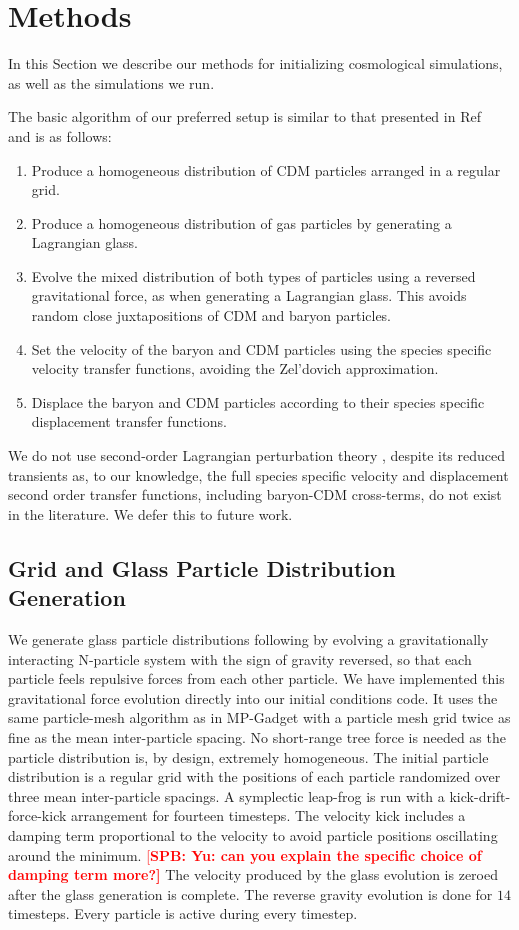 \documentclass[a4paper,11pt]{article}
\newcommand{\spb}[1]{\textcolor{red}{[\bf SPB: #1]} }
\begin{document}
\section{Methods}

In this Section we describe our methods for initializing cosmological simulations, as well as the simulations we run.

The basic algorithm of our preferred setup is similar to that presented in Ref~\cite{Yoshida:2003} and is as follows:
\begin{enumerate}
 \item Produce a homogeneous distribution of CDM particles arranged in a regular grid.
 \item Produce a homogeneous distribution of gas particles by generating a Lagrangian glass.
 \item Evolve the mixed distribution of both types of particles using a reversed gravitational force, as when generating a Lagrangian glass. This avoids random close juxtapositions of CDM and baryon particles.
 \item Set the velocity of the baryon and CDM particles using the species specific velocity transfer functions, avoiding the Zel'dovich approximation.
  \item Displace the baryon and CDM particles according to their species specific displacement transfer functions.
\end{enumerate}

We do not use second-order Lagrangian perturbation theory \cite{Scoccimarro:1998}, despite its reduced transients as, to our knowledge, the full species specific velocity and displacement second order transfer functions, including baryon-CDM cross-terms, do not exist in the literature. We defer this to future work.

\subsection{Grid and Glass Particle Distribution Generation}
\label{sec:glass}

We generate glass particle distributions following \cite{White:1994} by evolving a gravitationally interacting N-particle system with the sign of gravity reversed, so that each particle feels repulsive forces from each other particle. We have implemented this  gravitational force evolution directly into our initial conditions code. It uses the same particle-mesh algorithm as in MP-Gadget with a particle mesh grid twice as fine as the mean inter-particle spacing. No short-range tree force is needed as the particle distribution is, by design, extremely homogeneous. The initial particle distribution is a regular grid with the positions of each particle randomized over three mean inter-particle spacings. A symplectic leap-frog is run with a kick-drift-force-kick arrangement for fourteen timesteps. The velocity kick includes a damping term proportional to the velocity to avoid particle positions oscillating around the minimum. \spb{Yu: can you explain the specific choice of damping term more?} The velocity produced by the glass evolution is zeroed after the glass generation is complete. The reverse gravity evolution is done for $14$ timesteps. Every particle is active during every timestep.
\end{document}
